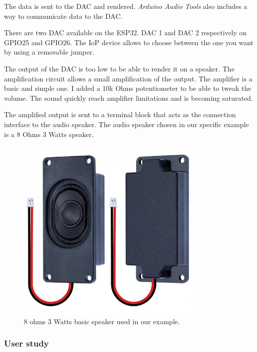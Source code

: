 The data is sent to the DAC and rendered. \textit{Arduino Audio Tools} also includes a way to communicate data to the
DAC.


There are two DAC available on the ESP32. DAC 1 and DAC 2 respectively on GPIO25 and GPIO26. The IoP device allows
to choose between the one you want by using a removable jumper.

The output of the DAC is too low to be able to render it on a speaker. The amplification circuit allows a small 
amplification of the output. The amplifier is a basic and simple one. I added a 10k Ohms potentiometer to be able to
tweak the volume. The sound quickly reach amplifier limitations and is becoming saturated. 

The amplified output is sent to a terminal block that acts as the connection interface to the audio speaker.
The audio speaker chosen in our specific example is a 8 Ohms 3 Watts speaker. 

\begin{figure}[h!]
    \centering
    \includegraphics[width=0.8\textwidth]{images/speaker.jpg}
    \caption{8 ohms 3 Watts basic speaker used in our example.} 
    \vspace{0.1cm}
    \label{fig:speaker}
\end{figure}


\newpage
\subsubsection{User study}

